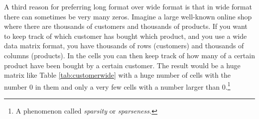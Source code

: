 \documentclass[]{book}\usepackage[]{graphicx}\usepackage[]{color}
\begin{document}
%
%
%
%
%

A third reason for preferring long format over wide format is that in wide format there can sometimes be very many zeros. Imagine a large well-known online shop where there are thousands of customers and thousands of products. If you want to keep track of which customer has bought which product, and you use a wide data matrix format, you have thousands of rows (customers) and thousands of columns (products). In the cells you can then keep track of how many of a certain product have been bought by a certain customer. The result would be a huge matrix like Table \ref{tab:customerwide} with a huge number of cells with the number 0 in them and only a very few cells with a number larger than 0.\footnote{A phenomenon called \textit{sparsity} or \textit{sparseness.}}
\end{document}

